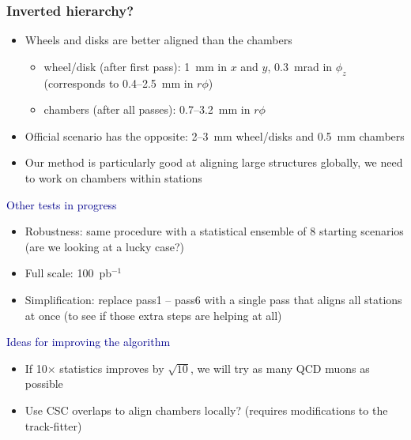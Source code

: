 \documentclass[compress]{beamer}
\begin{document}
\begin{frame}
\frametitle{Inverted hierarchy?}

\begin{itemize}\setlength{\itemsep}{0.5 cm}
\item Wheels and disks are better aligned than the chambers

\begin{itemize}\setlength{\itemsep}{0.2 cm}
\item wheel/disk (after first pass): 1~mm in $x$ and $y$, 0.3~mrad in $\phi_z$ \\ (corresponds to 0.4--2.5~mm in $r\phi$)
\item chambers (after all passes): 0.7--3.2~mm in $r\phi$
\end{itemize}

\item Official scenario has the opposite: 2--3~mm wheel/disks and 0.5~mm chambers

\item Our method is particularly good at aligning large structures
globally, we need to work on chambers within stations

\end{itemize}
\end{frame}

\begin{frame}
\hspace{-0.83 cm} \textcolor{darkblue}{\Large Other tests in progress}

\begin{itemize}\setlength{\itemsep}{0.2 cm}

\item Robustness: same procedure with a statistical ensemble of 8
starting scenarios (are we looking at a lucky case?)

\item Full scale: 100~pb$^{-1}$

\item Simplification: replace pass1 -- pass6 with a single pass that
aligns all stations at once (to see if those extra steps are helping at all)

\end{itemize}

\vfill
\hspace{-0.83 cm} \textcolor{darkblue}{\Large Ideas for improving the algorithm}

\begin{itemize}\setlength{\itemsep}{0.2 cm}
\item If 10$\times$ statistics improves by $\sqrt{10}$, we will try as many QCD muons as possible

\item Use CSC overlaps to align chambers locally? (requires modifications to the track-fitter)

\end{itemize}
\end{frame}
\end{document}
